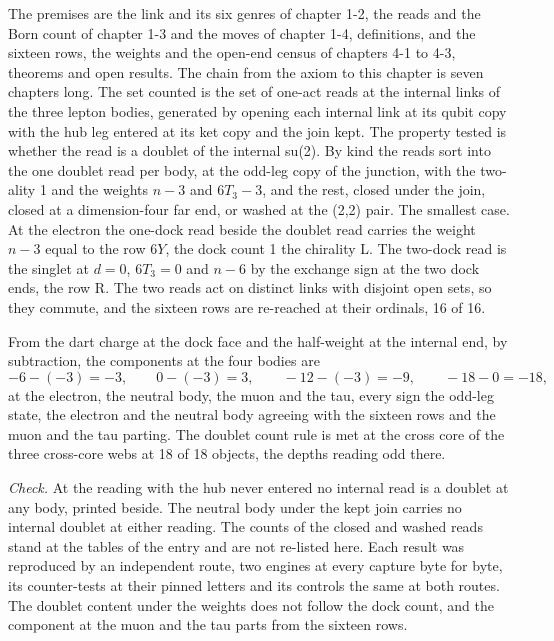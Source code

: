 \begin{chproof}[census]
The premises are the link and its six genres of chapter 1-2, the reads and the Born count of chapter 1-3 and the moves of chapter 1-4, definitions, and the sixteen rows, the weights and the open-end census of chapters 4-1 to 4-3, theorems and open results. The chain from the axiom to this chapter is seven chapters long. The set counted is the set of one-act reads at the internal links of the three lepton bodies, generated by opening each internal link at its qubit copy with the hub leg entered at its ket copy and the join kept. The property tested is whether the read is a doublet of the internal su(2). By kind the reads sort into the one doublet read per body, at the odd-leg copy of the junction, with the two-ality 1 and the weights $n - 3$ and $6T_3 - 3$, and the rest, closed under the join, closed at a dimension-four far end, or washed at the (2,2) pair. The smallest case. At the electron the one-dock read beside the doublet read carries the weight $n - 3$ equal to the row $6Y$, the dock count 1 the chirality L. The two-dock read is the singlet at $d = 0$, $6T_3 = 0$ and $n - 6$ by the exchange sign at the two dock ends, the row R. The two reads act on distinct links with disjoint open sets, so they commute, and the sixteen rows are re-reached at their ordinals, 16 of 16.

From the dart charge at the dock face and the half-weight at the internal end, by subtraction, the components at the four bodies are
\begin{equation}
-6 - (-3) = -3, \qquad 0 - (-3) = 3, \qquad -12 - (-3) = -9, \qquad -18 - 0 = -18 ,
\end{equation}
at the electron, the neutral body, the muon and the tau, every sign the odd-leg state, the electron and the neutral body agreeing with the sixteen rows and the muon and the tau parting. The doublet count rule is met at the cross core of the three cross-core webs at 18 of 18 objects, the depths reading odd there.

\emph{Check.} At the reading with the hub never entered no internal read is a doublet at any body, printed beside. The neutral body under the kept join carries no internal doublet at either reading. The counts of the closed and washed reads stand at the tables of the entry and are not re-listed here. Each result was reproduced by an independent route, two engines at every capture byte for byte, its counter-tests at their pinned letters and its controls the same at both routes.
The doublet content under the weights does not follow the dock count, and the component at the muon and the tau parts from the sixteen rows.
\end{chproof}
\label{chend:VI-3-doublets-handedness-and-parity-violation}
